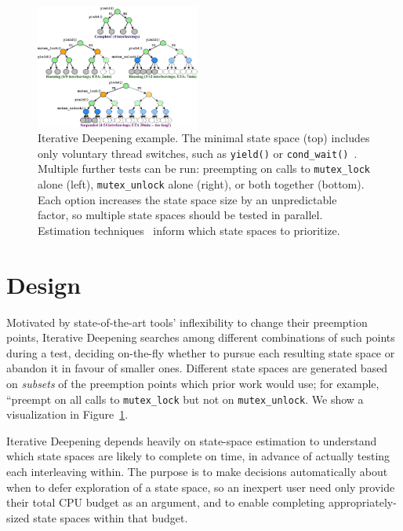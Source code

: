 \begin{figure}[t]
	\includegraphics[width=0.48\textwidth]{trees.pdf}
	\caption{Iterative Deepening example.
		The minimal state space (top) includes only voluntary thread switches, such as {\tt yield()} or {\tt cond\_wait()}~\cite{landslide}.
		Multiple further tests can be run: preempting on calls to {\tt mutex\_lock} alone (left), {\tt mutex\_unlock} alone (right), or both together (bottom).
Each option increases the state space size by an unpredictable factor, so multiple state spaces should be tested in parallel.
Estimation techniques~\cite{estimation} inform which state spaces to prioritize.
}
	\label{fig:id}
\end{figure}
\section{Design}

Motivated by state-of-the-art tools' inflexibility to change their preemption points,
Iterative Deepening searches among different combinations of such points during a test,
deciding on-the-fly whether to pursue each resulting state space or abandon it in favour of smaller ones.
Different state spaces are generated based on {\em subsets} of the preemption points which prior work would use; for example, ``preempt on all calls to {\tt mutex\_lock} but not on {\tt mutex\_unlock}.
We show a visualization in Figure~\ref{fig:id}.

Iterative Deepening depends heavily on state-space estimation \cite{estimation}
to understand which state spaces are likely to complete on time,
in advance of actually testing each interleaving within.
The purpose is to make decisions automatically about when to defer exploration of a state space,
so an inexpert user need only provide their total CPU budget as an argument,
and to enable completing appropriately-sized state spaces within that budget.

